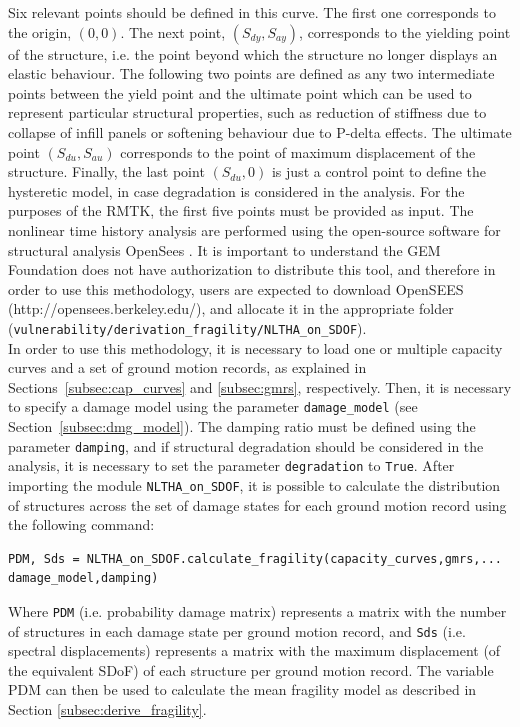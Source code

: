 Six relevant points should be defined in this curve. The first one corresponds to the origin, $(0, 0)$. The next point, $(S_{dy}, S_{ay})$, corresponds to the yielding point of the structure, i.e. the point beyond which the structure no longer displays an elastic behaviour. The following two points are defined as any two intermediate points between the yield point and the ultimate point which can be used to represent particular structural properties, such as reduction of stiffness due to collapse of infill panels or softening behaviour due to P-delta effects. The ultimate point $(S_{du}, S_{au})$ corresponds to the point of maximum displacement of the structure. Finally, the last point $(S_{du}, 0)$ is just a control point to define the hysteretic model, in case degradation is considered in the analysis. For the purposes of the RMTK, the first five points must be provided as input. The nonlinear time history analysis are performed using the open-source software for structural analysis OpenSees \citep{McKennaEtAl2000}. It is important to understand the GEM Foundation does not have authorization to distribute this tool, and therefore in order to use this methodology, users are expected to download OpenSEES (http://opensees.berkeley.edu/), and allocate it in the appropriate folder (\verb=vulnerability/derivation_fragility/NLTHA_on_SDOF=).\\

In order to use this methodology, it is necessary to load one or multiple capacity curves and a set of ground motion records, as explained in Sections~\ref{subsec:cap_curves} and \ref{subsec:gmrs}, respectively. Then, it is necessary to specify a damage model using the parameter \verb=damage_model= (see Section~\ref{subsec:dmg_model}). The damping ratio must be defined using the parameter \verb=damping=, and if structural degradation should be considered in the analysis, it is necessary to set the parameter \verb=degradation= to \verb=True=. After importing the module \verb=NLTHA_on_SDOF=, it is possible to calculate the distribution of structures across the set of damage states for each ground motion record using the following command:

\begin{Verbatim}[frame=single, commandchars=\\\{\}, samepage=true]
PDM, Sds = NLTHA_on_SDOF.calculate_fragility(capacity_curves,gmrs,...
damage_model,damping)
\end{Verbatim}

Where \verb=PDM= (i.e. probability damage matrix) represents a matrix with the number of structures in each damage state per ground motion record, and \verb=Sds= (i.e. spectral displacements) represents a matrix with the maximum displacement (of the equivalent SDoF) of each structure per ground motion record. The variable PDM can then be used to calculate the mean fragility model as described in Section \ref{subsec:derive_fragility}.